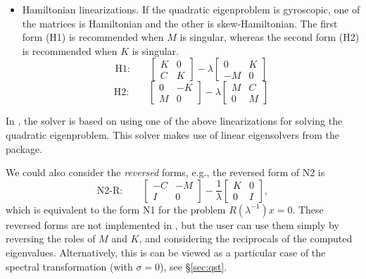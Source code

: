 \begin{itemize}
\medskip
\item Hamiltonian linearizations. If the quadratic eigenproblem is gyroscopic, one of the matrices is Hamiltonian and the other is skew-Hamiltonian. The first form (H1) is recommended when $M$ is singular, whereas the second form (H2) is recommended when $K$ is singular.
\begin{equation}
\label{eq:h1}
\mbox{H1:}\qquad
\left[\begin{array}{cc}K & 0\\C & K\end{array}\right]-\lambda\left[\begin{array}{cc} 0 & K\\-M & 0\end{array}\right]
\end{equation}
\begin{equation}
\label{eq:h2}
\mbox{H2:}\qquad
\left[\begin{array}{cc}0 & -K\\M & 0\end{array}\right]-\lambda\left[\begin{array}{cc}M & C\\ 0 & M\end{array}\right]
\end{equation}
\end{itemize}

In \slepc, the  solver is based on using one of the above linearizations for solving the quadratic eigenproblem. This solver makes use of linear eigensolvers from the  package.

We could also consider the \emph{reversed} forms, e.g., the reversed form of N2 is
\begin{equation}
\label{eq:n2r}
\mbox{N2-R:}\qquad
\left[\begin{array}{cc}-C & -M\\I & 0\end{array}\right]-\frac{1}{\lambda}\left[\begin{array}{cc}K & 0\\0 & I\end{array}\right],
\end{equation}
which is equivalent to the form N1 for the problem $R(\lambda^{-1})x=0$. These reversed forms are not implemented in \slepc, but the user can use them simply by reversing the roles of $M$ and $K$, and considering the reciprocals of the computed eigenvalues. Alternatively, this is can be viewed as a particular case of the spectral transformation (with $\sigma=0$), see \S\ref{sec:qst}.

